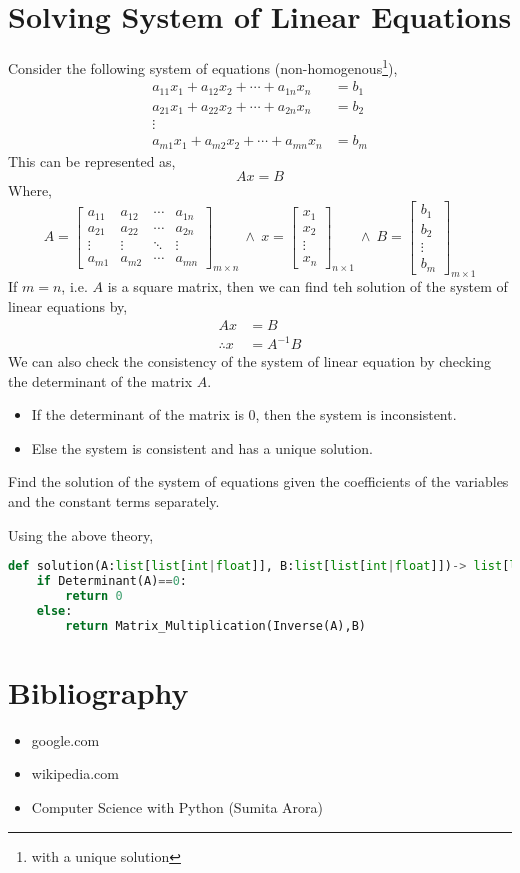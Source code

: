 \section{Solving System of Linear Equations}
Consider the following system of equations (non-homogenous\footnote{with a unique solution}),
\[\begin{split}
	a_{11}x_{1}+a_{12}x_2+\cdots +a_{1n}x_n&=b_1\\
	a_{21}x_{1}+a_{22}x_2+\cdots +a_{2n}x_n&=b_2\\
	\vdots  & \\
	a_{m1}x_{1}+a_{m2}x_2+\cdots +a_{mn}x_n&=b_m
\end{split}\]
This can be represented as,
\[Ax=B\]
Where,
\[A=\begin{bmatrix}
	a_{11} & a_{12} & \cdots & a_{1n}\\
	a_{21} & a_{22} & \cdots & a_{2n}\\
	\vdots & \vdots & \ddots & \vdots \\
	a_{m1} & a_{m2} & \cdots & a_{mn}
\end{bmatrix}_{m\times n} \ \land \ x=\begin{bmatrix}
	x_1\\
	x_2\\
	\vdots\\
	x_n
\end{bmatrix}_{n\times 1} \ \land \ B=\begin{bmatrix}
	b_{1}\\
	b_2\\
	\vdots\\
	b_m
\end{bmatrix}_{m\times 1}\]
If $m=n$, i.e. $A$ is a square matrix, then we can find teh solution of the system of linear equations by,
\[\begin{split}
	Ax&=B\\
	\therefore x&=A^{-1}B
\end{split}\] 
We can also check the consistency of the system of linear equation by checking the determinant of the matrix $A$.
\begin{itemize}
	\item If the determinant of the matrix is 0, then the system is inconsistent.
	\item Else the system is consistent and has a unique solution.
\end{itemize}
\begin{eg}
	Find the solution of the system of equations given the coefficients of the variables and the constant terms separately.
\end{eg}
\begin{explanation}
	Using the above theory,
	\begin{lstlisting}[language=Python]
def solution(A:list[list[int|float]], B:list[list[int|float]])-> list[list[int|float]]|int:
    if Determinant(A)==0:
        return 0
    else:
        return Matrix_Multiplication(Inverse(A),B)\end{lstlisting}
\end{explanation}
\newpage
\section{Bibliography}
\begin{itemize}
	\item google.com
	\item wikipedia.com
	\item Computer Science with Python (Sumita Arora)
\end{itemize}
